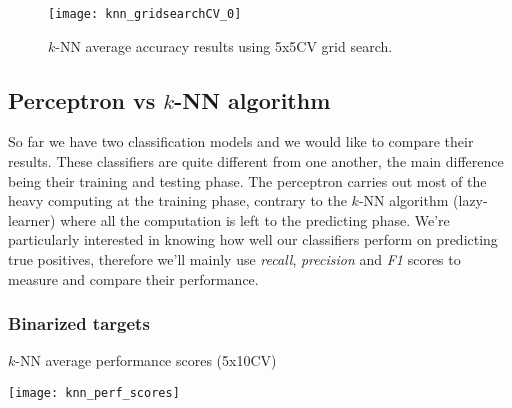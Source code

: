 \begin{figure}
	\centering
	\texttt{[image: knn\_gridsearchCV\_0]}
	\caption{$k$-NN average accuracy results using 5x5CV grid search.}
	\label{tbl:knn_gridsearchCV}
\end{figure}

\subsection{Perceptron vs $k$-NN algorithm}
So far we have two classification models and we would like to compare their results. These classifiers are quite different from one another, the main difference being their training and testing phase. The perceptron carries out  most of the heavy computing at the training phase, contrary to the $k$-NN algorithm (lazy-learner) where all the computation is left to the predicting phase. We're particularly interested in knowing how well our classifiers perform on predicting true positives, therefore we'll mainly use \textit{recall}, \textit{precision} and \textit{F1} scores to measure and compare their performance.\\

\subsubsection{Binarized targets}
\begin{table}[]
	\renewcommand{\arraystretch}{1.3}
	\caption{$k$-NN average performance scores (5x10CV)}
	\label{tbl:knn_perf_scores}
	\centering
	\texttt{[image: knn\_perf\_scores]}
\end{table}

